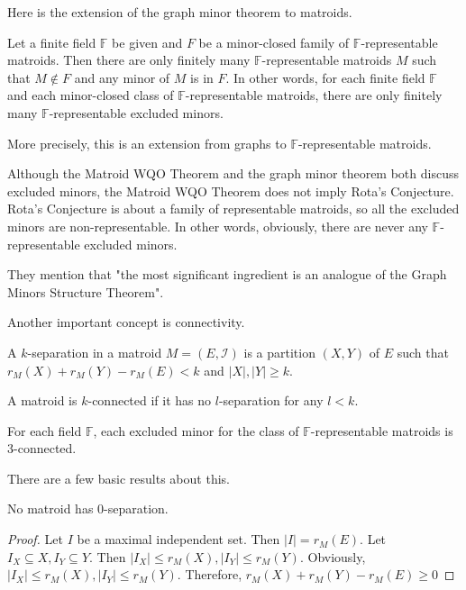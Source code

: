 Here is the extension of the graph minor theorem to matroids.

\begin{thm} 
Let a finite field $\mathbb{F}$ be given and $F$ be a minor-closed family of $\mathbb{F}$-representable matroids.
Then there are only finitely many $\mathbb{F}$-representable matroids $M$ such that $M \notin F$ and any minor of $M$ is in $F$.
In other words, for each finite field $\mathbb{F}$ and each minor-closed class of $\mathbb{F}$-representable matroids, there are only finitely many $\mathbb{F}$-representable excluded minors.
\end{thm}

More precisely, this is an extension from graphs to $\mathbb{F}$-representable matroids.

Although the Matroid WQO Theorem and the graph minor theorem both discuss excluded minors, the Matroid WQO Theorem does not imply Rota's Conjecture.
Rota's Conjecture is about a family of representable matroids, so all the excluded minors are non-representable.
In other words, obviously, there are never any $\mathbb{F}$-representable excluded minors.

They mention that "the most significant ingredient is an analogue of the Graph Minors Structure Theorem".

Another important concept is connectivity.
\begin{defn}
A $k$-separation in a matroid $M = (E, \mathcal{I})$ is a partition $(X, Y)$ of $E$ such that $r_M(X) + r_M(Y) - r_M(E) < k$ and $\lvert X \rvert, \lvert Y \rvert \geq k$.
\end{defn}
\begin{defn}
A matroid is $k$-connected if it has no $l$-separation for any $l < k$.
\end{defn}

\begin{lem}
For each field $\mathbb{F}$, each excluded minor for the class of $\mathbb{F}$-representable matroids is 3-connected.
\end{lem}

There are a few basic results about this.

\begin{thm}
No matroid has 0-separation.
\end{thm}
\begin{proof}
Let $I$ be a maximal independent set.
Then $\lvert I \rvert = r_M(E)$.
Let $I_X \subseteq X, I_Y \subseteq Y$.
Then $\lvert I_X \rvert \leq r_M(X), \lvert I_Y \rvert \leq r_M(Y)$.
Obviously, $\lvert I_X \rvert \leq r_M(X), \lvert I_Y \rvert \leq r_M(Y)$.
Therefore, $r_M(X) + r_M(Y) - r_M(E) \geq 0$
\end{proof}


